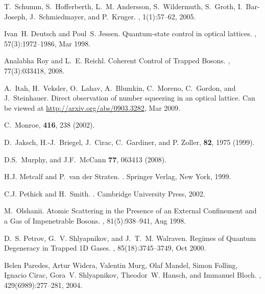 \documentclass{article}
\begin{document}
\begin{thebibliography}{10}
T.~Schumm, S.~Hofferberth, L.~M. Andersson, S.~Wildermuth, S.~Groth,
  I.~Bar-Joseph, J.~Schmiedmayer, and P.~Kruger.
, 1(1):57--62, 2005.

Ivan~H. Deutsch and Poul~S. Jessen.
\newblock Quantum-state control in optical lattices.
, 57(3):1972--1986, Mar 1998.

Analabha Roy and L.~E. Reichl.
\newblock Coherent {C}ontrol of {T}rapped {B}osons.
,
  77(3):033418, 2008.

A.~Itah, H.~Veksler, O.~Lahav, A.~Blumkin, C.~Moreno, C.~Gordon, and
  J.~Steinhauer.
\newblock Direct observation of number squeezing in an optical lattice.
\newblock Can be viewed at \url{http://arxiv.org/abs/0903.3282}, Mar 2009.

C.~Monroe, 
 {\bf 416}, 238 (2002).

D.~Jaksch, H.-J.~Briegel, J.~Cirac, C.~Gardiner, and P. Zoller, 
 {\bf 82}, 1975 (1999).

D.S.~Murphy, and J.F.~McCann
 {\bf 77}, 063413 (2008).

H.J. Metcalf and P.~{van der Straten}.
.
\newblock Springer Verlag, New York, 1999.

C.J. Pethick and H.~Smith.
.
\newblock Cambridge University Press, 2002.

M.~Olshanii.
\newblock Atomic {S}cattering in the {P}resence of an {E}xternal {C}onfinement
  and a {G}as of {I}mpenetrable {B}osons.
, 81(5):938--941, Aug 1998.

D.~S. Petrov, G.~V. Shlyapnikov, and J.~T.~M. Walraven.
\newblock Regimes of {Q}uantum {D}egeneracy in {T}rapped 1{D} {G}ases.
, 85(18):3745--3749, Oct 2000.

Belen Paredes, Artur Widera, Valentin Murg, Olaf Mandel, Simon Folling, Ignacio
  Cirac, Gora~V. Shlyapnikov, Theodor~W. Hansch, and Immanuel Bloch.
, 429(6989):277--281, 2004.


\end{thebibliography}
\end{document}
